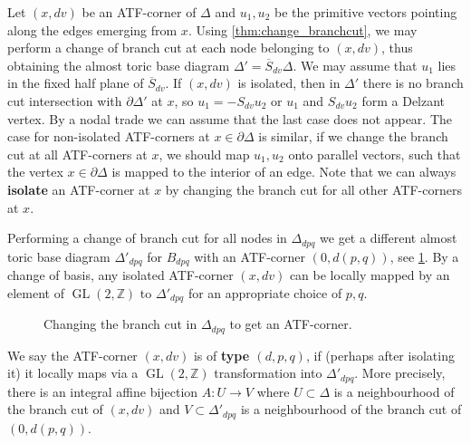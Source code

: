 \documentclass[12pt,a4paper,abstract=true,draft]{scrartcl}
\DeclareMathOperator{\GL}{GL}
\begin{document}
Let $(x,dv)$ be an ATF-corner of $Δ$ and $u_1,u_2$ be the primitive vectors pointing along the edges emerging from $x$.
Using \cref{thm:change_branchcut}, we may perform a change of branch cut at each node belonging to $(x,dv)$, thus obtaining the almost toric base diagram $Δ' = \overline{S}_{dv}Δ$.
We may assume that $u_1$ lies in the fixed half plane of $\overline{S}_{dv}$.
If $(x,dv)$ is isolated, then in $Δ'$ there is no branch cut intersection with $∂Δ'$ at $x$, so $u_1 = -S_{dv}u_2$ or $u_1$ and $S_{dv}u_2$ form a Delzant vertex.
By a nodal trade we can assume that the last case does not appear.
The case for non-isolated ATF-corners at $x ∈ ∂Δ$ is similar, if we change the branch cut at all ATF-corners at $x$, we should map $u_1,u_2$ onto parallel vectors, such that the vertex $x ∈ ∂Δ$ is mapped to the interior of an edge.
Note that we can always \textbf{isolate} an ATF-corner at $x$ by changing the branch cut for all other ATF-corners at $x$.

Performing a change of branch cut for all nodes in $Δ_{dpq}$ we get a different almost toric base diagram $Δ'_{dpq}$ for $B_{dpq}$ with an ATF-corner $(0,d(p,q))$, see \cref{fig:Bdpq_moment_image_alt}.
By a change of basis, any isolated ATF-corner $(x,dv)$ can be locally mapped by an element of $\GL(2,ℤ)$ to $Δ'_{dpq}$ for an appropriate choice of $p,q$.

\begin{figure}
\centering
{}   
\caption{Changing the branch cut in $Δ_{dpq}$ to get an ATF-corner.}
\label{fig:Bdpq_moment_image_alt}
\end{figure}

\begin{definition}
  \label{def:atf_corner_type}
  We say the ATF-corner $(x,dv)$ is of \textbf{type $(d,p,q)$}, if (perhaps after isolating it) it locally maps via a $\GL(2,ℤ)$ transformation into $Δ'_{dpq}$. More precisely, there is an integral affine bijection $A\colon U → V$ where $U ⊂ Δ$ is a neighbourhood of the branch cut of $(x,dv)$ and $V ⊂ Δ'_{dpq}$ is a neighbourhood of the branch cut of $(0,d(p,q))$.
\end{definition}
\end{document}
